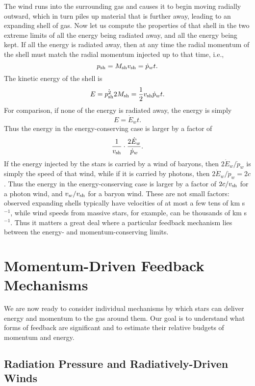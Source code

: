 The wind runs into the surrounding gas and causes it to begin moving radially outward, which in turn piles up material that is further away, leading to an expanding shell of gas. Now let us compute the properties of that shell in the two extreme limits of all the energy being radiated away, and all the energy being kept. If all the energy is radiated away, then at any time the radial momentum of the shell must match the radial momentum injected up to that time, i.e.,
\begin{equation}
p_{\rm sh} = M_{\rm sh} v_{\rm sh} = \dot{p}_w t.
\end{equation}
The kinetic energy of the shell is
\begin{equation}
E = \dot{p_{\rm sh}^2}{2 M_{\rm sh}} = \frac{1}{2} v_{\rm sh} \dot{p}_w t.
\end{equation} 
For comparison, if none of the energy is radiated away, the energy is simply
\begin{equation}
E = \dot{E}_w t.
\end{equation}
Thus the energy in the energy-conserving case is larger by a factor of
\begin{equation}
\frac{1}{v_{\rm sh}} \cdot \frac{2\dot{E}_w}{\dot{p}_w}.
\end{equation}
If the energy injected by the stars is carried by a wind of baryons, then $2\dot{E}_w/\dot{p}_w$ is simply the speed of that wind, while if it is carried by photons, then $2\dot{E}_w/\dot{p}_w = 2 c$. Thus the energy in the energy-conserving case is larger by a factor of $2c/v_{\rm sh}$ for a photon wind, and $v_w/v_{\rm sh}$ for a baryon wind. These are not small factors: observed expanding shells typically have velocities of at most a few tens of km s$^{-1}$, while wind speeds from massive stars, for example, can be thousands of km s$^{-1}$. Thus it matters a great deal where a particular feedback mechanism lies between the energy- and momentum-conserving limits.

\section{Momentum-Driven Feedback Mechanisms}

We are now ready to consider individual mechanisms by which stars can deliver energy and momentum to the gas around them. Our goal is to understand what forms of feedback are significant and to estimate their relative budgets of momentum and energy.

\subsection{Radiation Pressure and Radiatively-Driven Winds}


